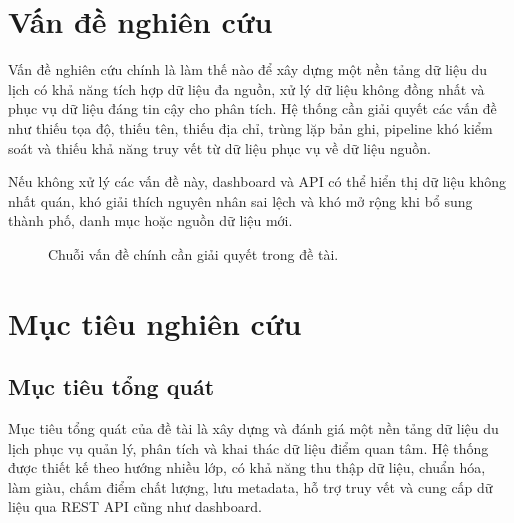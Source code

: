 \documentclass[12pt,a4paper]{article}
\begin{document}
\section{Vấn đề nghiên cứu}

Vấn đề nghiên cứu chính là làm thế nào để xây dựng một nền tảng dữ liệu du lịch có khả năng tích hợp dữ liệu đa nguồn, xử lý dữ liệu không đồng nhất và phục vụ dữ liệu đáng tin cậy cho phân tích. Hệ thống cần giải quyết các vấn đề như thiếu tọa độ, thiếu tên, thiếu địa chỉ, trùng lặp bản ghi, pipeline khó kiểm soát và thiếu khả năng truy vết từ dữ liệu phục vụ về dữ liệu nguồn.

Nếu không xử lý các vấn đề này, dashboard và API có thể hiển thị dữ liệu không nhất quán, khó giải thích nguyên nhân sai lệch và khó mở rộng khi bổ sung thành phố, danh mục hoặc nguồn dữ liệu mới.

\begin{figure}[htbp]
\centering
{}
\caption{Chuỗi vấn đề chính cần giải quyết trong đề tài.}
\end{figure}

\section{Mục tiêu nghiên cứu}

\subsection{Mục tiêu tổng quát}

Mục tiêu tổng quát của đề tài là xây dựng và đánh giá một nền tảng dữ liệu du lịch phục vụ quản lý, phân tích và khai thác dữ liệu điểm quan tâm. Hệ thống được thiết kế theo hướng nhiều lớp, có khả năng thu thập dữ liệu, chuẩn hóa, làm giàu, chấm điểm chất lượng, lưu metadata, hỗ trợ truy vết và cung cấp dữ liệu qua REST API cũng như dashboard.
\end{document}
